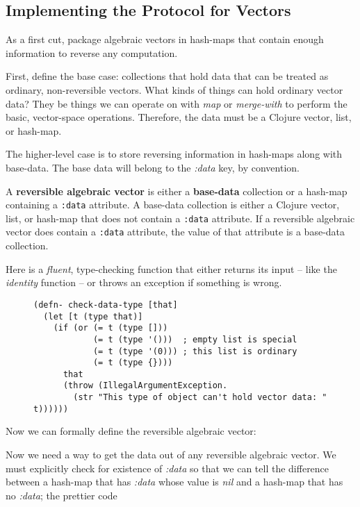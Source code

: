 \documentclass[11pt]{article}
\begin{document}
\subsection{Implementing the Protocol for Vectors}
\label{sec-2-1}

As a first cut, package algebraic vectors in hash-maps that contain
enough information to reverse any computation.

First, define the base case: collections that hold data that can be
treated as ordinary, non-reversible vectors.  What kinds of things can
hold ordinary vector data?  They be things we can operate on with \emph{map}
or \emph{merge-with} to perform the basic, vector-space operations.
Therefore, the data must be a Clojure vector, list, or hash-map.

The higher-level case is to store reversing information in hash-maps
along with base-data. The base data will belong to the \emph{:data} key, by
convention.

\begin{mydefinition}
A \textbf{reversible algebraic vector} is either a \textbf{base-data} collection
or a hash-map containing a \texttt{:data} attribute. A base-data
collection is either a Clojure vector, list, or hash-map that does
not contain a \texttt{:data} attribute. If a reversible algebraic vector
does contain a \texttt{:data} attribute, the value of that attribute
is a base-data collection.
\end{mydefinition}

Here is a \emph{fluent}, type-checking function that either returns its input
-- like the \emph{identity} function -- or throws an exception if something
is wrong.

\begin{figure}[H]
\label{check-data-type}
\begin{verbatim}
(defn- check-data-type [that]
  (let [t (type that)]
    (if (or (= t (type []))
            (= t (type '()))  ; empty list is special
            (= t (type '(0))) ; this list is ordinary
            (= t (type {})))
      that
      (throw (IllegalArgumentException.
        (str "This type of object can't hold vector data: " t))))))
\end{verbatim}
\end{figure}

Now we can formally define the reversible algebraic vector:

Now we need a way to get the data out of any reversible algebraic
vector. We must explicitly check for existence of \emph{:data} so that we can
tell the difference between a hash-map that has \emph{:data} whose value is
\emph{nil} and a hash-map that has no \emph{:data}; the prettier code
\end{document}
